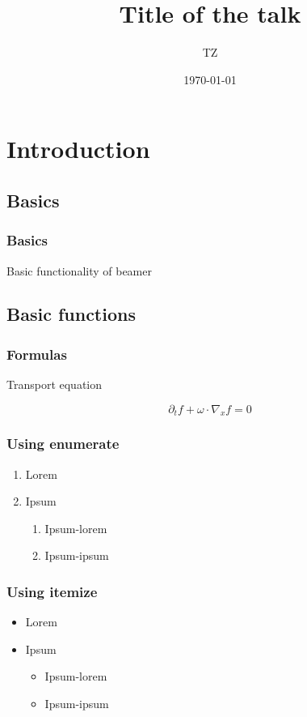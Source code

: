 \documentclass{beamer}
\title{Title of the talk}
\author{TZ}
\institute{CMLS, l'X
}
\date{\today}
\begin{document}
\frametitlepage %

\frametoc %

\section{Introduction}
\subsection{Basics}
\begin{frame}
	\frametitle{Basics}
Basic functionality of beamer
	
\end{frame}


\subsection{Basic functions}

\begin{frame}
	\frametitle{Formulas}
	Transport equation

	\begin{center}
		 \[\partial_t f+\omega\cdot\nabla_x f =0\]
	\end{center}

\end{frame}

\begin{frame}
\frametitle{Using enumerate}
\begin{enumerate}
\item Lorem 
\item Ipsum
\begin{enumerate}
\item Ipsum-lorem
\item Ipsum-ipsum
\end{enumerate}
\end{enumerate}

\end{frame}

\begin{frame}
\frametitle{Using itemize}
\begin{itemize}
\item Lorem 
\item Ipsum
\begin{itemize}
\item Ipsum-lorem
\item Ipsum-ipsum
\end{itemize}
\end{itemize}
\end{frame}
\end{document}
